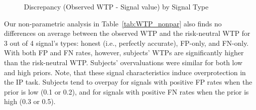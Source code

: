 \documentclass[12pt,a4paper]{article}
\begin{document}
\begin{figure}[H]\centering 
	\caption{Discrepancy (Observed WTP - Signal value) by Signal Type} \label{fig:WTPhist}
	\hfill
	\hfill
	\vspace{2em}
	\hfill
	\hfill

\end{figure}

Our non-parametric analysis in Table~\ref{tab:WTP_nonpar} also finds no differences on average between the observed WTP and the risk-neutral WTP for 3 out of 4 signal's types: honest (i.e., perfectly accurate), FP-only, and FN-only. With both FP and FN rates, however, subjects' WTPs are significantly higher than the risk-neutral WTP. Subjects' overvaluations were similar for both low and high priors. Note, that these signal characteristics induce overprotection in the IP task. Subjects tend to overpay for signals with positive FP rates when the prior is low (0.1 or 0.2), and for signals with positive FN rates when the prior is high (0.3 or 0.5).
\end{document}
